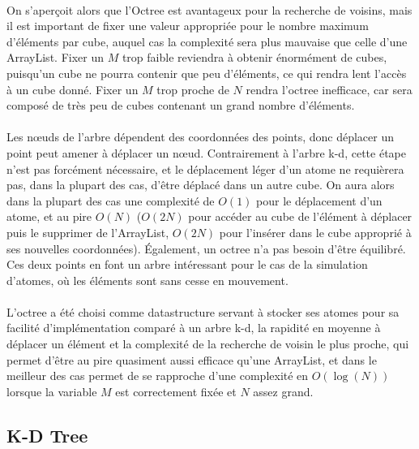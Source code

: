 \paragraph{}
On s'aperçoit alors que l'Octree est avantageux pour la recherche de voisins,
mais il est important de fixer une valeur appropriée pour le nombre maximum
d'éléments par cube, auquel cas la complexité sera plus mauvaise que celle
d'une ArrayList. Fixer un $M$ trop faible reviendra à obtenir énormément de
cubes, puisqu'un cube ne pourra contenir que peu d'éléments, ce qui rendra lent
l'accès à un cube donné. Fixer un $M$ trop proche de $N$ rendra l'octree
inefficace, car sera composé de très peu de cubes contenant un grand nombre
d'éléments.

\paragraph{}
Les nœuds de l'arbre dépendent des coordonnées des points, donc déplacer un
point peut amener à déplacer un nœud. Contrairement à l'arbre k-d, cette étape
n'est pas forcément nécessaire, et le déplacement léger d'un atome ne
requièrera pas, dans la plupart des cas, d'être déplacé dans un autre cube.  On
aura alors dans la plupart des cas une complexité de $O(1)$ pour le déplacement
d'un atome, et au pire $O(N)$ ($O(2N)$ pour accéder au cube de l'élément à
déplacer puis le supprimer de l'ArrayList, $O(2N)$ pour l'insérer dans le cube
approprié à ses nouvelles coordonnées). Également, un octree n'a pas besoin
d'être équilibré. Ces deux points en font un arbre intéressant pour le cas de
la simulation d'atomes, où les éléments sont sans cesse en mouvement.

\paragraph{}
L'octree a été choisi comme datastructure servant à stocker ses atomes pour sa
facilité d'implémentation comparé à un arbre k-d, la rapidité en moyenne à
déplacer un élément et la complexité de la recherche de voisin le plus proche,
qui permet d'être au pire quasiment aussi efficace qu'une ArrayList, et dans le
meilleur des cas permet de se rapproche d'une complexité en $O(\log(N))$
lorsque la variable $M$ est correctement fixée et $N$ assez grand.

\subsection{K-D Tree}

